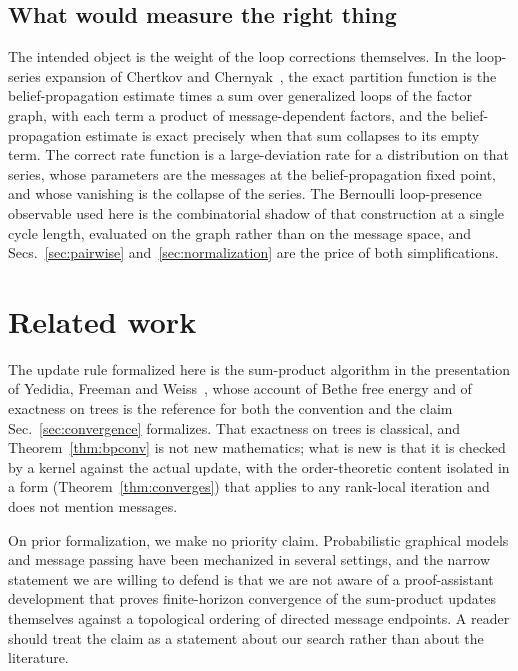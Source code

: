 \documentclass[aps,prx,reprint,nofootinbib,floatfix]{revtex4-2}
\begin{document}
\subsection{What would measure the right thing}

The intended object is the weight of the loop corrections themselves. In the
loop-series expansion of Chertkov and
Chernyak~\cite{ChertkovChernyak2006LoopSeries}, the exact partition function is
the belief-propagation estimate times a sum over generalized loops of the
factor graph, with each term a product of message-dependent factors, and the
belief-propagation estimate is exact precisely when that sum collapses to its
empty term. The correct rate function is a large-deviation rate for a
distribution on that series, whose parameters are the messages at the
belief-propagation fixed point, and whose vanishing is the collapse of the
series. The Bernoulli loop-presence observable used here is the combinatorial
shadow of that construction at a single cycle length, evaluated on the graph
rather than on the message space, and Secs.~\ref{sec:pairwise}
and~\ref{sec:normalization} are the price of both simplifications.

\section{Related work}
\label{sec:related}

The update rule formalized here is the sum-product algorithm in the
presentation of Yedidia, Freeman and Weiss~\cite{YedidiaFreemanWeiss2003},
whose account of Bethe free energy and of exactness on trees is the reference
for both the convention and the claim Sec.~\ref{sec:convergence} formalizes.
That exactness on trees is classical, and Theorem~\ref{thm:bpconv} is not new
mathematics; what is new is that it is checked by a kernel against the actual
update, with the order-theoretic content isolated in a form
(Theorem~\ref{thm:converges}) that applies to any rank-local iteration and does
not mention messages.

On prior formalization, we make no priority claim. Probabilistic graphical
models and message passing have been mechanized in several settings, and the
narrow statement we are willing to defend is that we are not aware of a
proof-assistant development that proves finite-horizon convergence of the
sum-product updates themselves against a topological ordering of directed
message endpoints. A reader should treat the claim as a statement about our
search rather than about the literature.
\end{document}

